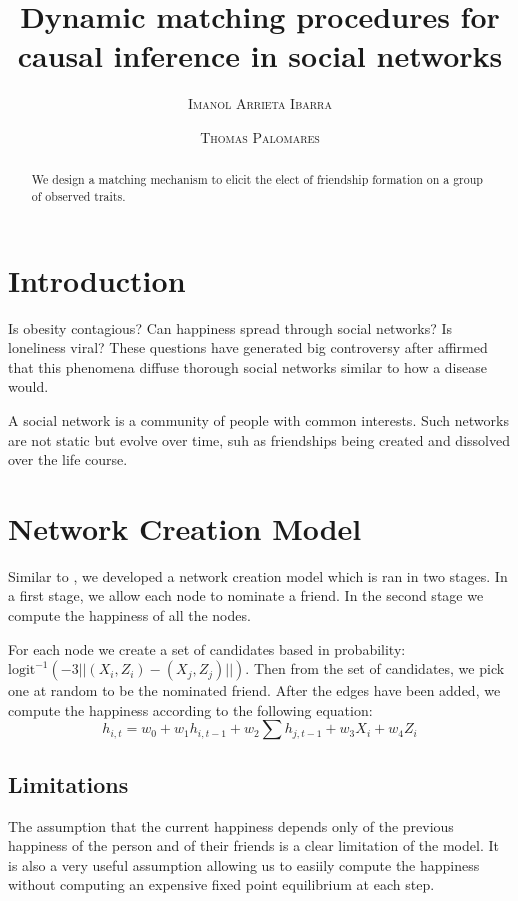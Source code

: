 \documentclass[11pt]{article}
\title{Dynamic matching procedures for causal inference in social networks}
\author{{\textsc{Imanol Arrieta Ibarra}} \\
 \and {\textsc{Thomas Palomares}} \\
}
\begin{document}
\maketitle


\begin{abstract}
We design a matching mechanism to elicit the elect of friendship formation on a group of observed traits.
\end{abstract}

\newpage

\section{Introduction}

Is obesity contagious? Can happiness spread through social networks? Is loneliness viral? These questions have generated big controversy after \cite{christakis2007spread} affirmed that this phenomena diffuse thorough social networks similar to how a disease would.

A social network is a community of people with common interests. Such networks are not static but evolve over time, suh as friendships being created and dissolved over the life course. 

\section{Network Creation Model}

Similar to \cite{christakis2007spread}, we developed a network creation model which is ran in two stages. In a first stage, we allow each node to nominate a friend. In the second stage we compute the happiness of all the nodes.

For each node we create a set of candidates based in probability: $\text{logit}^{-1} \left(-3||(X_i,Z_i)-(X_j,Z_j)||\right)$. Then from the set of candidates, we pick one at random to be the nominated friend. After the edges have been added, we compute the happiness according to the following equation:
$$h_{i,t} = w_0 +w_1 h_{i,t-1} + w_2\sum\limits h_{j,t-1} + w_3 X_{i} + w_4 Z_{i}$$

\subsection{Limitations}

The assumption that the current happiness depends only of the previous happiness of the person and of their friends is a clear limitation of the model. It is also a very useful assumption allowing us to easiily compute the happiness without computing an expensive fixed point equilibrium at each step.




\end{document}
